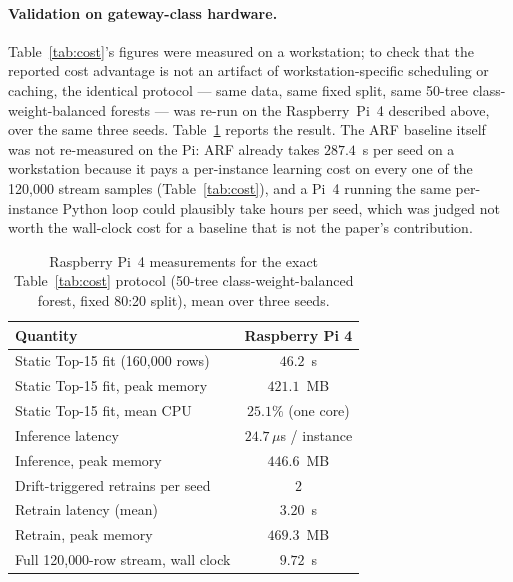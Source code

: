 \documentclass[11pt,a4paper]{article}
\begin{document}
\paragraph{Validation on gateway-class hardware.} Table~\ref{tab:cost}'s
figures were measured on a workstation; to check that the reported cost
advantage is not an artifact of workstation-specific scheduling or
caching, the identical protocol --- same data, same fixed split, same
50-tree class-weight-balanced forests --- was re-run on the Raspberry~Pi~4
described above, over the same three seeds. Table~\ref{tab:picost}
reports the result. The ARF baseline itself was not re-measured on the
Pi: ARF already takes $287.4$~s per seed on a workstation because it
pays a per-instance learning cost on every one of the 120{,}000 stream
samples (Table~\ref{tab:cost}), and a Pi~4 running the same per-instance
Python loop could plausibly take hours per seed, which was judged not
worth the wall-clock cost for a baseline that is not the paper's
contribution.

\begin{table}[!ht]
\centering
\caption{Raspberry Pi~4 measurements for the exact Table~\ref{tab:cost}
protocol (50-tree class-weight-balanced forest, fixed 80:20 split), mean
over three seeds.}
\label{tab:picost}
\small
\begin{tabular}{lc}
\toprule
\textbf{Quantity} & \textbf{Raspberry Pi 4} \\
\midrule
Static Top-15 fit (160{,}000 rows) & $46.2$~s \\
Static Top-15 fit, peak memory & $421.1$~MB \\
Static Top-15 fit, mean CPU & $25.1\%$ (one core) \\
Inference latency & $24.7\,\mu$s / instance \\
Inference, peak memory & $446.6$~MB \\
Drift-triggered retrains per seed & $2$ \\
Retrain latency (mean) & $3.20$~s \\
Retrain, peak memory & $469.3$~MB \\
Full 120{,}000-row stream, wall clock & $9.72$~s \\
\bottomrule
\end{tabular}
\end{table}
\end{document}
